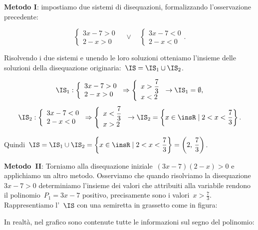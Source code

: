 \begin{soluzione}
\textbf{Metodo I}: impostiamo due sistemi di disequazioni, formalizzando
l'osservazione precedente:

\[\left\{\begin{array}{l}
	 3x-7>0\\
	 2-x>0
	\end{array}
	 \right.\quad\vee\quad
 \left\{\begin{array}{l}
	 3x-7<0\\
	 2-x<0
	\end{array}
 \right..\]

 Risolvendo i due sistemi e unendo le loro soluzioni otteniamo
l'insieme delle soluzioni della disequazione
originaria:~$\IS=\IS_{1}\cup \IS_{2}$.

 \[\IS_{1}: \left\{\begin{array}{l}
		  3x-7>0\\
		  2-x>0
		 \end{array}
	  \right.
\Rightarrow\left\{\begin{array}{l}
		 x>\dfrac{7}{3}\\
		 x<2
		 \end{array}
	  \right.
\rightarrow \IS_{1}=\emptyset\text{,}\]
\[\IS_{2}: \left\{\begin{array}{l}
		 3x-7<0\\
		 2-x<0
		 \end{array}\right.
\Rightarrow\left\{\begin{array}{l}
		 x<\dfrac{7}{3}\\
		 x>2
		 \end{array}\right.
\rightarrow\IS_{2}=\left\{x\in\insR\mid 2<x<\dfrac{7}{3}\right\}.\]

Quindi~$\IS=\IS_{1}\cup\IS_{2}=\left\{x\in\insR\mid 2<x<\dfrac{7}{3}\right\}=\left(2\text{,~}\dfrac{7}{3}\right)$.

\textbf{Metodo~II}: Torniamo alla disequazione iniziale~$(3x-7)(2-x)>0$ e
applichiamo un altro metodo. Osserviamo che quando risolviamo la
disequazione~$3x-7>0$ determiniamo l'insieme
dei valori che attribuiti alla variabile rendono il polinomio~$P_1=3x-7$
positivo, precisamente sono i valori~$x>\frac{7}{3}$. Rappresentiamo
l'~$\IS$ con una semiretta in grassetto come in figura:
\begin{center}

\end{center}

In realtà, nel grafico sono contenute tutte le informazioni sul segno
del polinomio:


\end{soluzione}
